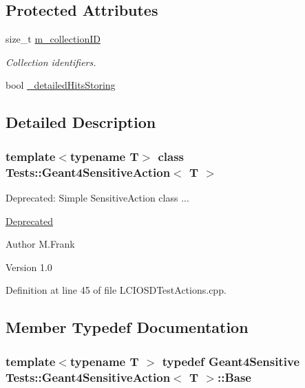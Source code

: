 \subsection*{Protected Attributes}
\begin{DoxyCompactItemize}
\item 
size\_\-t \hyperlink{class_tests_1_1_geant4_sensitive_action_a44a9e95251d84b3da5f5115530f9cde8}{m\_\-collectionID}
\begin{DoxyCompactList}\small\item\em Collection identifiers. \item\end{DoxyCompactList}\item 
bool \hyperlink{class_tests_1_1_geant4_sensitive_action_ab3efbf4bd030df529554961e46bb0823}{\_\-detailedHitsStoring}
\end{DoxyCompactItemize}


\subsection{Detailed Description}
\subsubsection*{template$<$typename T$>$ class Tests::Geant4SensitiveAction$<$ T $>$}

Deprecated: Simple SensitiveAction class ... \begin{Desc}
\item[\hyperlink{deprecated__deprecated000008}{Deprecated}]\end{Desc}
\begin{DoxyAuthor}{Author}
M.Frank 
\end{DoxyAuthor}
\begin{DoxyVersion}{Version}
1.0 
\end{DoxyVersion}


Definition at line 45 of file LCIOSDTestActions.cpp.

\subsection{Member Typedef Documentation}
\hypertarget{class_tests_1_1_geant4_sensitive_action_afb2235077e4e86f00859155e5379bbad}{
\subsubsection[{Base}]{\setlength{\rightskip}{0pt plus 5cm}template$<$typename T $>$ typedef {\bf Geant4Sensitive} {\bf Tests::Geant4SensitiveAction}$<$ {\bf T} $>$::{\bf Base}}}
\label{class_tests_1_1_geant4_sensitive_action_afb2235077e4e86f00859155e5379bbad}


